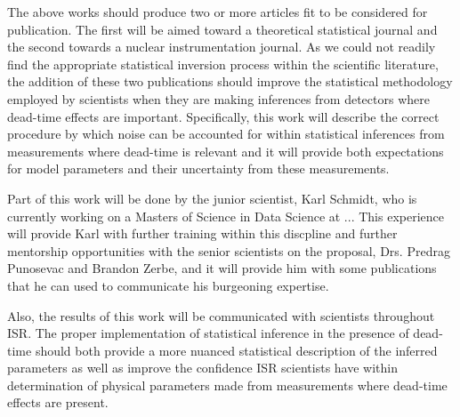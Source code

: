 \documentclass{article}
\begin{document}
The above works should produce two or more articles fit to be considered for publication.  The first will be aimed toward
a theoretical statistical journal and the second towards a nuclear instrumentation journal.  As we could not
readily find the appropriate statistical inversion process within the scientific literature, the addition of these two
publications should improve the statistical methodology employed by scientists when they are making inferences
from detectors where dead-time effects are important.  Specifically, this work will describe the correct procedure
by which noise can be accounted for within statistical inferences from measurements where dead-time is relevant and
it will provide both expectations for model parameters and their uncertainty from these measurements.

Part of this work will be done by the junior scientist, Karl Schmidt, who is currently working on a Masters of Science in Data Science at ...
This experience will provide Karl with further training within this discpline and further mentorship opportunities
with the senior scientists on the proposal, Drs. Predrag Punosevac and Brandon Zerbe, and it will provide
him with some publications that he can used to communicate his burgeoning expertise.

Also, the results of this work will be communicated with scientists throughout ISR.  The proper implementation
of statistical inference in the presence of dead-time should both provide a more nuanced statistical description
of the inferred parameters as well as improve the confidence ISR scientists have within determination of physical 
parameters made from measurements where dead-time effects are present. 
\end{document}
